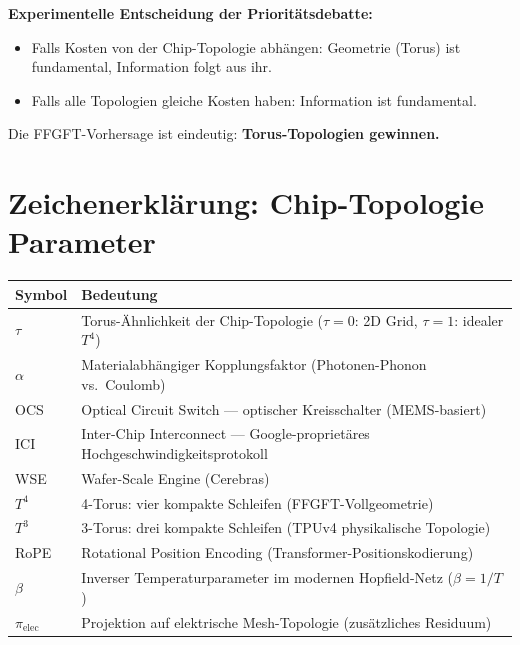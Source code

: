 \textbf{Experimentelle Entscheidung der Prioritätsdebatte:}
\begin{itemize}
  \item Falls Kosten von der Chip-Topologie abhängen: Geometrie (Torus) ist
        fundamental, Information folgt aus ihr.
  \item Falls alle Topologien gleiche Kosten haben: Information ist fundamental.
\end{itemize}

Die FFGFT-Vorhersage ist eindeutig: \textbf{Torus-Topologien gewinnen.}


\section*{Zeichenerklärung: Chip-Topologie Parameter}

\begin{center}
\renewcommand{\arraystretch}{1.3}
{\small
\begin{tabular}{p{2cm}p{10cm}}
\toprule
\textbf{Symbol} & \textbf{Bedeutung} \\
\midrule
$\tau$ & Torus-Ähnlichkeit der Chip-Topologie ($\tau=0$: 2D Grid, $\tau=1$: idealer $T^4$) \\
$\alpha$ & Materialabhängiger Kopplungsfaktor (Photonen-Phonon vs.\ Coulomb) \\
OCS & Optical Circuit Switch --- optischer Kreisschalter (MEMS-basiert) \\
ICI & Inter-Chip Interconnect --- Google-proprietäres Hochgeschwindigkeitsprotokoll \\
WSE & Wafer-Scale Engine (Cerebras) \\
$T^4$ & 4-Torus: vier kompakte Schleifen (FFGFT-Vollgeometrie) \\
$T^3$ & 3-Torus: drei kompakte Schleifen (TPUv4 physikalische Topologie) \\
RoPE & Rotational Position Encoding (Transformer-Positionskodierung) \\
$\beta$ & Inverser Temperaturparameter im modernen Hopfield-Netz ($\beta = 1/T$) \\
$\pi_\text{elec}$ & Projektion auf elektrische Mesh-Topologie (zusätzliches Residuum) \\
\bottomrule
\end{tabular}
}
\end{center}


